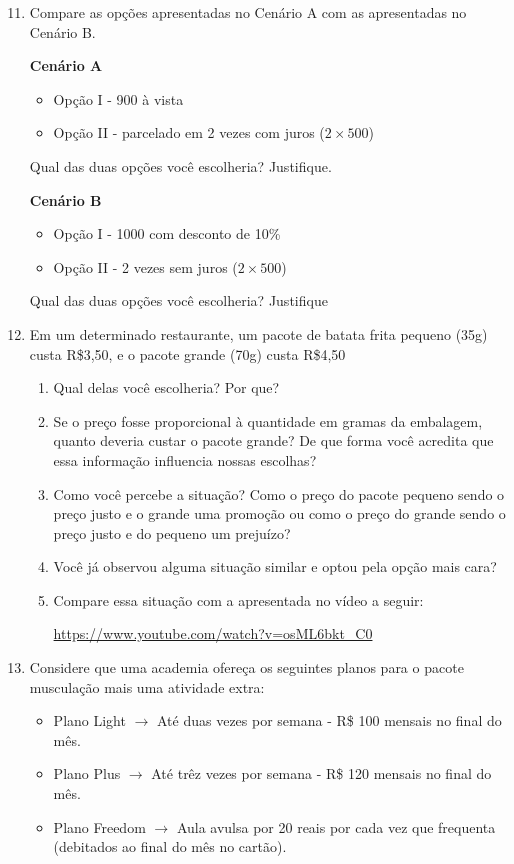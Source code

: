 \begin{enumerate}\setcounter{enumi}{10}
\item Compare as opções apresentadas no Cenário A com as apresentadas no Cenário B.

\textbf{Cenário A}
\begin{itemize}
  \item Opção I - 900 à vista
  \item Opção II - parcelado em 2 vezes com juros ($2 \times 500$)
  \end{itemize}

Qual das duas opções você escolheria? Justifique.

\textbf{Cenário B}
  \begin{itemize}
  \item Opção I - 1000 com desconto de 10\%
  \item Opção II - 2 vezes sem juros ($2 \times 500$)
  \end{itemize}
Qual das duas opções você escolheria? Justifique

\item Em um determinado restaurante, um pacote de batata frita pequeno (35g) custa R\$3,50, e o pacote grande (70g) custa R\$4,50
  \begin{enumerate}
  \item Qual delas você escolheria? Por que?
  \item Se o preço fosse proporcional à quantidade em gramas da embalagem, quanto deveria custar o pacote grande? De que forma você acredita que essa informação influencia nossas escolhas?
  \item Como você percebe a situação? Como o preço do pacote pequeno sendo o preço justo e o grande uma promoção ou como o preço do grande sendo o preço justo e do pequeno um prejuízo?
  \item Você já observou alguma situação similar e optou pela opção mais cara?
  \item Compare essa situação com a apresentada no vídeo a seguir:


  \url{https://www.youtube.com/watch?v=osML6bkt_C0}
  \end{enumerate}

\item Considere que uma academia ofereça os seguintes planos para o pacote musculação mais uma atividade extra:

  \begin{itemize}
  \item Plano Light $\longrightarrow$ Até duas vezes por semana - R\$ 100 mensais no final do mês.
  \item Plano Plus $\longrightarrow$ Até trêz vezes por semana - R\$ 120 mensais  no final do mês.
  \item Plano Freedom $\longrightarrow$ Aula avulsa por 20 reais por cada vez que frequenta (debitados ao final do mês no cartão).
  \end{itemize}


\end{enumerate}
